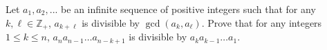 Let $a_1, a_2,...$ be an infinite sequence of positive integers such that for any $k,\ell\in \mathbb{Z_+}$, $a_{k+\ell}$ is divisible by $\gcd(a_k,a_\ell)$. Prove that for any integers $1\leqslant k\leqslant n$, $a_na_{n-1}\dots a_{n-k+1}$ is divisible by $a_ka_{k-1}\dots a_1$.